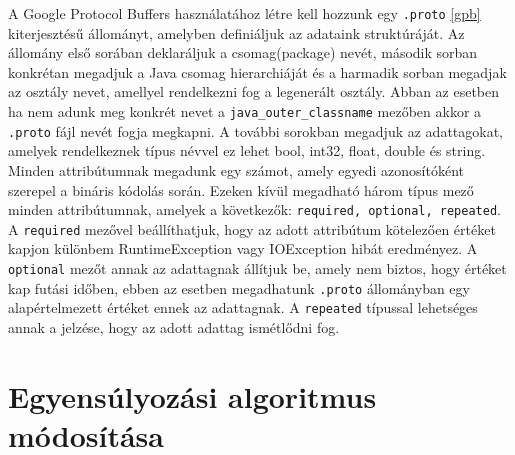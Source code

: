 A Google Protocol Buffers használatához létre kell hozzunk egy \texttt{.proto} \ref{gpb} kiterjesztésű állományt, amelyben definiáljuk az adataink struktúráját. Az állomány első sorában deklaráljuk a csomag(package) nevét, második sorban konkrétan megadjuk a Java csomag hierarchiáját és a harmadik sorban megadjak az osztály nevet, amellyel rendelkezni fog a legenerált osztály. Abban az esetben ha nem adunk meg konkrét nevet a \texttt{java\_outer\_classname} mezőben akkor a \texttt{.proto} fájl nevét fogja megkapni. A további sorokban megadjuk az adattagokat, amelyek rendelkeznek típus névvel ez lehet bool, int32, float, double és string. Minden attribútumnak megadunk egy számot, amely egyedi azonosítóként szerepel a bináris kódolás során. Ezeken kívül megadható három típus mező minden attribútumnak, amelyek a következők: \texttt{required, optional, repeated}. A \texttt{required} mezővel beállíthatjuk, hogy az adott attribútum kötelezően értéket kapjon különbem RuntimeException vagy IOException hibát eredményez.  A \texttt{optional} mezőt annak az adattagnak állítjuk be, amely nem biztos, hogy értéket kap futási időben, ebben az esetben megadhatunk \texttt{.proto} állományban egy alapértelmezett értéket ennek az adattagnak. A \texttt{repeated} típussal lehetséges annak a jelzése, hogy az adott adattag ismétlődni fog.



\section{Egyensúlyozási algoritmus módosítása}\label{sec:MEGVALOSITAS:pidModositas}





 
